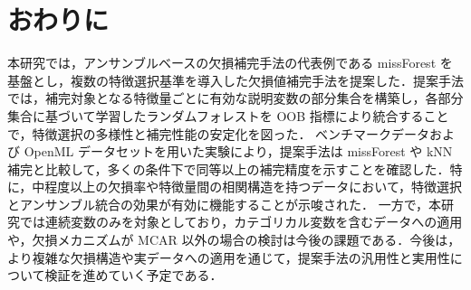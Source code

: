 \section{おわりに}

本研究では，アンサンブルベースの欠損補完手法の代表例である missForest を基盤とし，複数の特徴選択基準を導入した欠損値補完手法を提案した．提案手法では，補完対象となる特徴量ごとに有効な説明変数の部分集合を構築し，各部分集合に基づいて学習したランダムフォレストを OOB 指標により統合することで，特徴選択の多様性と補完性能の安定化を図った．
ベンチマークデータおよび OpenML データセットを用いた実験により，提案手法は missForest や kNN 補完と比較して，多くの条件下で同等以上の補完精度を示すことを確認した．特に，中程度以上の欠損率や特徴量間の相関構造を持つデータにおいて，特徴選択とアンサンブル統合の効果が有効に機能することが示唆された．
一方で，本研究では連続変数のみを対象としており，カテゴリカル変数を含むデータへの適用や，欠損メカニズムが MCAR 以外の場合の検討は今後の課題である．今後は，より複雑な欠損構造や実データへの適用を通じて，提案手法の汎用性と実用性について検証を進めていく予定である．
